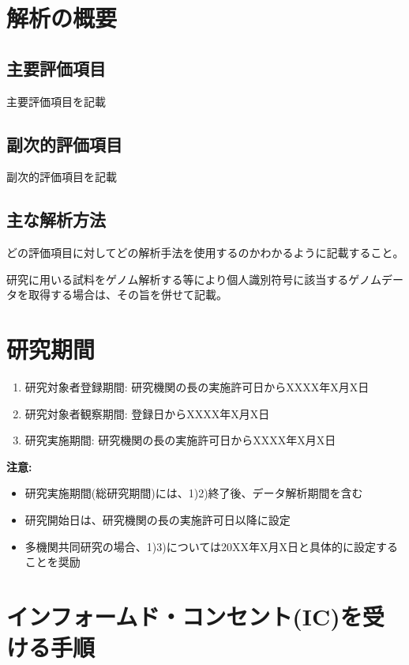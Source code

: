 \documentclass{kyodai-protocol}
\begin{document}
\section{解析の概要}

\subsection{主要評価項目}
主要評価項目を記載

\subsection{副次的評価項目}
副次的評価項目を記載

\subsection{主な解析方法}
どの評価項目に対してどの解析手法を使用するのかわかるように記載すること。

研究に用いる試料をゲノム解析する等により個人識別符号に該当するゲノムデータを取得する場合は、その旨を併せて記載。

\section{研究期間}
\label{sec:period}

\begin{enumerate}
\item 研究対象者登録期間: 研究機関の長の実施許可日からXXXX年X月X日
\item 研究対象者観察期間: 登録日からXXXX年X月X日
\item 研究実施期間: 研究機関の長の実施許可日からXXXX年X月X日
\end{enumerate}

\textbf{注意:}
\begin{itemize}
\item 研究実施期間(総研究期間)には、1)2)終了後、データ解析期間を含む
\item 研究開始日は、研究機関の長の実施許可日以降に設定
\item 多機関共同研究の場合、1)3)については20XX年X月X日と具体的に設定することを奨励
\end{itemize}

\section{インフォームド・コンセント(IC)を受ける手順}
\label{sec:ic}
\end{document}
